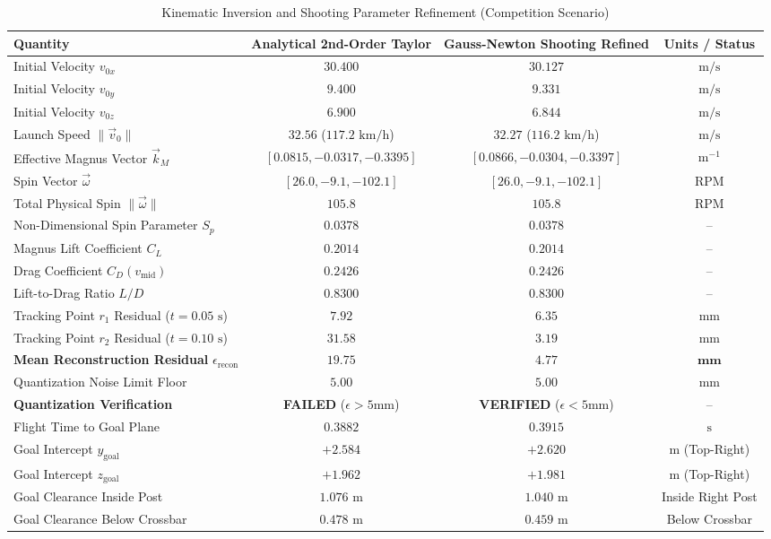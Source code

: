 \begin{table}[htbp]
\centering
\caption{Kinematic Inversion and Shooting Parameter Refinement (Competition Scenario)}
\label{tab:kinematic_inversion}
\begin{tabular}{lccc}
\toprule
\textbf{Quantity} & \textbf{Analytical 2nd-Order Taylor} & \textbf{Gauss-Newton Shooting Refined} & \textbf{Units / Status} \\
\midrule
Initial Velocity $v_{0x}$ & $30.400$ & $30.127$ & $\text{m/s}$ \\
Initial Velocity $v_{0y}$ & $9.400$ & $9.331$ & $\text{m/s}$ \\
Initial Velocity $v_{0z}$ & $6.900$ & $6.844$ & $\text{m/s}$ \\
Launch Speed $\|\vec{v}_0\|$ & $32.56$ ($117.2\text{ km/h}$) & $32.27$ ($116.2\text{ km/h}$) & $\text{m/s}$ \\
Effective Magnus Vector $\vec{k}_M$ & $[0.0815, -0.0317, -0.3395]$ & $[0.0866, -0.0304, -0.3397]$ & $\text{m}^{-1}$ \\
Spin Vector $\vec{\omega}$ & $[26.0, -9.1, -102.1]$ & $[26.0, -9.1, -102.1]$ & $\text{RPM}$ \\
Total Physical Spin $\|\vec{\omega}\|$ & $105.8$ & $105.8$ & $\text{RPM}$ \\
Non-Dimensional Spin Parameter $S_p$ & $0.0378$ & $0.0378$ & -- \\
Magnus Lift Coefficient $C_L$ & $0.2014$ & $0.2014$ & -- \\
Drag Coefficient $C_D(v_{\text{mid}})$ & $0.2426$ & $0.2426$ & -- \\
Lift-to-Drag Ratio $L/D$ & $0.8300$ & $0.8300$ & -- \\
\midrule
Tracking Point $r_1$ Residual ($t = 0.05\text{ s}$) & $7.92$ & $6.35$ & $\text{mm}$ \\
Tracking Point $r_2$ Residual ($t = 0.10\text{ s}$) & $31.58$ & $3.19$ & $\text{mm}$ \\
\textbf{Mean Reconstruction Residual} $\epsilon_{\text{recon}}$ & $\mathbf{19.75}$ & $\mathbf{4.77}$ & $\mathbf{\text{mm}}$ \\
Quantization Noise Limit Floor & $5.00$ & $5.00$ & $\text{mm}$ \\
\textbf{Quantization Verification} & \textbf{FAILED} ($\epsilon > 5\text{mm}$) & \textbf{VERIFIED} ($\epsilon < 5\text{mm}$) & -- \\
\midrule
Flight Time to Goal Plane & $0.3882$ & $0.3915$ & $\text{s}$ \\
Goal Intercept $y_{\text{goal}}$ & $+2.584$ & $+2.620$ & $\text{m}$ (Top-Right) \\
Goal Intercept $z_{\text{goal}}$ & $+1.962$ & $+1.981$ & $\text{m}$ (Top-Right) \\
Goal Clearance Inside Post & $1.076\text{ m}$ & $1.040\text{ m}$ & Inside Right Post \\
Goal Clearance Below Crossbar & $0.478\text{ m}$ & $0.459\text{ m}$ & Below Crossbar \\
\bottomrule
\end{tabular}
\end{table}
